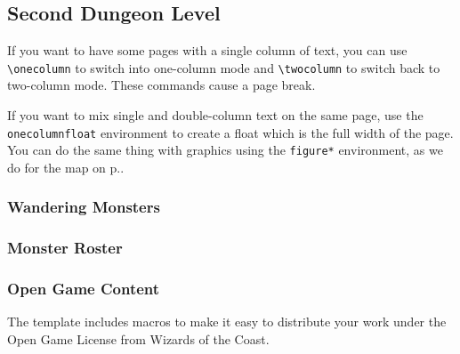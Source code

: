 \documentclass[a4paper,serif]{module}       %
\begin{document}

\begin{onecolumnfloat}[t]
\part{Second Dungeon Level}

If you want to have some pages with a single column of text, you can use \verb|\onecolumn| to switch
into one-column mode and \verb|\twocolumn| to switch back to two-column mode. These commands cause
a page break.

If you want to mix single and double-column text on the same page, use the \verb|onecolumnfloat| environment
to create a float which is the full width of the page. You can do the same thing with graphics using
the \verb|figure*| environment, as we do for the map on p.\pageref{img:map}.

\section*{Wandering Monsters}
\label{wanderingmonsters}

\begin{wanderingmonsters}[b]
\end{wanderingmonsters}

\section*{Monster Roster}

\begin{monsterroster}
\end{monsterroster}
\end{onecolumnfloat}

\lipsum

\section{Open Game Content}
\label{ogl}

The template includes macros to make it easy to distribute your work under the Open Game License from Wizards of the Coast.
\end{document}
